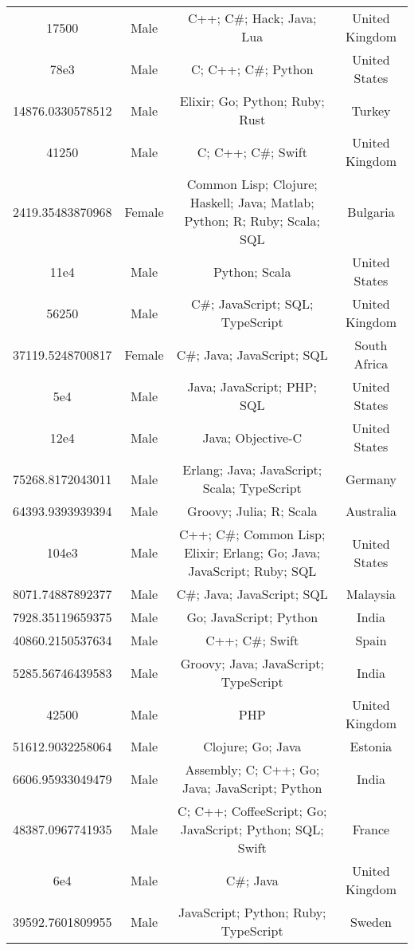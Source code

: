 \begin{center}
\begin{tabular}{ |c|c|c|c| }
17500  &  Male  &  C++; C\#; Hack; Java; Lua  &  United Kingdom  \\ 
78e3  &  Male  &  C; C++; C\#; Python  &  United States  \\ 
14876.0330578512  &  Male  &  Elixir; Go; Python; Ruby; Rust  &  Turkey  \\ 
41250  &  Male  &  C; C++; C\#; Swift  &  United Kingdom  \\ 
2419.35483870968  &  Female  &  Common Lisp; Clojure; Haskell; Java; Matlab; Python; R; Ruby; Scala; SQL  &  Bulgaria  \\ 
11e4  &  Male  &  Python; Scala  &  United States  \\ 
56250  &  Male  &  C\#; JavaScript; SQL; TypeScript  &  United Kingdom  \\ 
37119.5248700817  &  Female  &  C\#; Java; JavaScript; SQL  &  South Africa  \\ 
5e4  &  Male  &  Java; JavaScript; PHP; SQL  &  United States  \\ 
12e4  &  Male  &  Java; Objective-C  &  United States  \\ 
75268.8172043011  &  Male  &  Erlang; Java; JavaScript; Scala; TypeScript  &  Germany  \\ 
64393.9393939394  &  Male  &  Groovy; Julia; R; Scala  &  Australia  \\ 
104e3  &  Male  &  C++; C\#; Common Lisp; Elixir; Erlang; Go; Java; JavaScript; Ruby; SQL  &  United States  \\ 
8071.74887892377  &  Male  &  C\#; Java; JavaScript; SQL  &  Malaysia  \\ 
7928.35119659375  &  Male  &  Go; JavaScript; Python  &  India  \\ 
40860.2150537634  &  Male  &  C++; C\#; Swift  &  Spain  \\ 
5285.56746439583  &  Male  &  Groovy; Java; JavaScript; TypeScript  &  India  \\ 
42500  &  Male  &  PHP  &  United Kingdom  \\ 
51612.9032258064  &  Male  &  Clojure; Go; Java  &  Estonia  \\ 
6606.95933049479  &  Male  &  Assembly; C; C++; Go; Java; JavaScript; Python  &  India  \\ 
48387.0967741935  &  Male  &  C; C++; CoffeeScript; Go; JavaScript; Python; SQL; Swift  &  France  \\ 
6e4  &  Male  &  C\#; Java  &  United Kingdom  \\ 
39592.7601809955  &  Male  &  JavaScript; Python; Ruby; TypeScript  &  Sweden  \\ 

\end{tabular}
\end{center}
